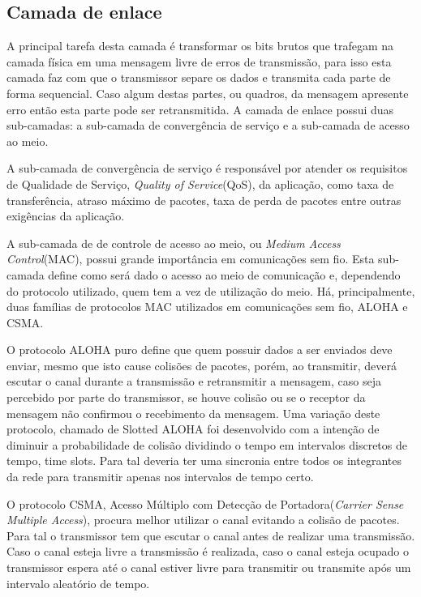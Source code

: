 \subsection{Camada de enlace}
A principal tarefa desta camada é transformar os bits brutos que trafegam na camada física em uma mensagem livre de erros de transmissão, para isso esta camada faz com que o transmissor separe os dados e transmita cada parte de forma sequencial. Caso algum destas partes, ou quadros, da mensagem apresente erro então esta parte pode ser retransmitida. A camada de enlace possui duas sub-camadas: a sub-camada de convergência de serviço e a sub-camada de acesso ao meio.

A sub-camada de convergência de serviço é responsável por atender os requisitos de Qualidade de Serviço, \emph{Quality of Service}(QoS), da aplicação, como taxa de transferência, atraso máximo de pacotes, taxa de perda de pacotes entre outras exigências da aplicação.

A sub-camada de de controle de acesso ao meio, ou \emph{Medium Access Control}(MAC), possui grande importância em comunicações sem fio. Esta sub-camada define como será dado o acesso ao meio de comunicação e, dependendo do protocolo utilizado, quem tem a vez de utilização do meio. Há, principalmente, duas famílias de protocolos MAC utilizados em comunicações sem fio, ALOHA e CSMA.

O protocolo ALOHA puro define que quem possuir dados a ser enviados deve enviar, mesmo que isto cause colisões de pacotes, porém, ao transmitir, deverá escutar o canal durante a transmissão e retransmitir a mensagem, caso seja percebido por parte do transmissor, se houve colisão ou se o receptor da mensagem não confirmou o recebimento da mensagem. Uma variação deste protocolo, chamado de Slotted ALOHA foi desenvolvido com a intenção de diminuir a probabilidade de colisão dividindo o tempo em intervalos discretos de tempo, time slots. Para tal deveria ter uma sincronia entre todos os integrantes da rede para transmitir apenas nos intervalos de tempo certo.

O protocolo CSMA, Acesso Múltiplo com Detecção de Portadora(\emph{Carrier Sense Multiple Access}), procura melhor utilizar o canal evitando a colisão de pacotes. Para tal o transmissor tem que escutar o canal antes de realizar uma transmissão. Caso o canal esteja livre a transmissão é realizada, caso o canal esteja ocupado o transmissor espera até o canal estiver livre para transmitir ou transmite após um intervalo aleatório de tempo.


